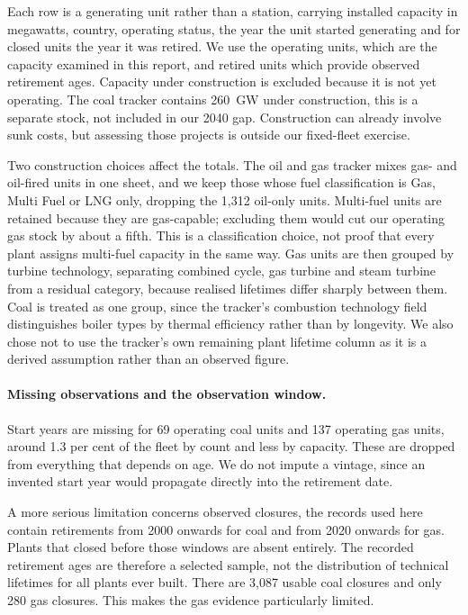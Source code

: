 \documentclass[11pt,a4paper]{article}
\begin{document}
Each row is a generating unit rather than a station, carrying installed capacity in megawatts, country, operating status, the year the unit started generating and for closed units the year it was retired. We use the operating units, which are the capacity examined in this report, and retired units which provide observed retirement ages. Capacity under construction is excluded because it is not yet operating. The coal tracker contains 260~GW under construction, this is a separate stock, not included in our 2040 gap. Construction can already involve sunk costs, but assessing those projects is outside our fixed-fleet exercise.

Two construction choices affect the totals. The oil and gas tracker mixes gas- and oil-fired units in one sheet, and we keep those whose fuel classification is Gas, Multi Fuel or LNG only, dropping the 1,312 oil-only units. Multi-fuel units are retained because they are gas-capable; excluding them would cut our operating gas stock by about a fifth. This is a classification choice, not proof that every plant assigns multi-fuel capacity in the same way. Gas units are then grouped by turbine technology, separating combined cycle, gas turbine and steam turbine from a residual category, because realised lifetimes differ sharply between them. Coal is treated as one group, since the tracker's combustion technology field distinguishes boiler types by thermal efficiency rather than by longevity. We also chose not to use the tracker's own remaining plant lifetime column as it is a derived assumption rather than an observed figure.

\paragraph{Missing observations and the observation window.}

Start years are missing for 69 operating coal units and 137 operating gas units, around 1.3 per cent of the fleet by count and less by capacity. These are dropped from everything that depends on age. We do not impute a vintage, since an invented start year would propagate directly into the retirement date.

A more serious limitation concerns observed closures, the records used here contain retirements from 2000 onwards for coal and from 2020 onwards for gas. Plants that closed before those windows are absent entirely. The recorded retirement ages are therefore a selected sample, not the distribution of technical lifetimes for all plants ever built. There are 3,087 usable coal closures and only 280 gas closures. This makes the gas evidence particularly limited.
\end{document}
